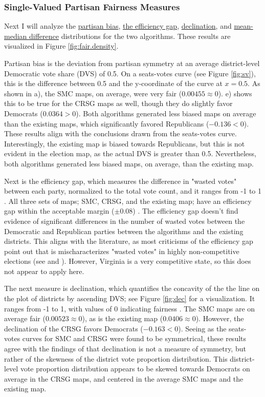 \subsubsection{Single-Valued Partisan Fairness Measures}

Next I will analyze the \hyperref[sec:bias]{partisan bias}, \hyperref[sec:effgap]{the efficiency gap}, \hyperref[sec:declination]{declination}, and \hyperref[sec:meanmed]{mean-median difference} distributions for the two algorithms. These results are visualized in Figure \ref{fig:fair.density}.

Partisan bias is the deviation from partisan symmetry at an average district-level Democratic vote share (DVS) of 0.5. On a seats-votes curve (see Figure \ref{fig:sv}), this is the difference between 0.5 and the y-coordinate of the curve at $x=0.5$. As shown in a), the SMC maps, on average, were very fair ($0.00455 \approx 0$). e) shows this to be true for the CRSG maps as well, though they do slightly favor Democrats ($0.0364 > 0$). Both algorithms generated less biased maps on average than the existing maps, which significantly favored Republicans ($-0.136 < 0$). These results align with the conclusions drawn from the seats-votes curve. Interestingly, the existing map is biased towards Republicans, but this is not evident in the election map, as the actual DVS is greater than 0.5. Nevertheless, both algorithms generated less biased maps, on average, than the existing map. 

Next is the efficiency gap, which measures the difference in "wasted votes" between each party, normalized to the total vote count, and it ranges from -1 to 1 \parencite{stephanopoulos2015}. All three sets of maps; SMC, CRSG, and the existing map; have an efficiency gap within the acceptable margin ($\pm 0.08$) \parencite{stephanopoulos2015}. The efficiency gap doesn't find evidence of significant differences in the number of wasted votes between the Democratic and Republican parties between the algorithms and the existing districts. This aligns with the literature, as most criticisms of the efficiency gap point out that is mischaracterizes "wasted votes" in highly non-competitive elections (see \textcite{veomett2018} and \textcite{katz2020}). However, Virginia is a very competitive state, so this does not appear to apply here.

The next measure is declination, which quantifies the concavity of the the line on the plot of districts by ascending DVS; see Figure \ref{fig:dec} for a visualization. It ranges from -1 to 1, with values of 0 indicating fairness \parencite{warrington2018}. The SMC maps are on average fair ($0.00523 \approx 0$), as is the existing map ($0.0406 \approx 0$). However, the declination of the CRSG favors Democrats ($-0.163 < 0$). Seeing as the seats-votes curves for SMC and CRSG were found to be symmetrical, these results agree with the findings of \textcite{katz2020} that declination is not a measure of symmetry, but rather of the skewness of the district vote proportion distribution. This district-level vote proportion distribution appears to be skewed towards Democrats on average in the CRSG maps, and centered in the average SMC maps and the existing map. 

